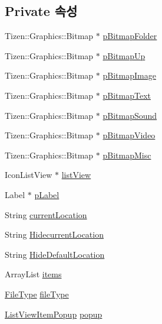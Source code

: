 \subsection*{Private 속성}
\begin{DoxyCompactItemize}
\item 
Tizen\+::\+Graphics\+::\+Bitmap $\ast$ \hyperlink{class_folder_browser_a59c025c6956a8a9ef74395d12261a36e}{p\+Bitmap\+Folder}
\item 
Tizen\+::\+Graphics\+::\+Bitmap $\ast$ \hyperlink{class_folder_browser_a7299cea38b070d659f6b2e35e4dbdd08}{p\+Bitmap\+Up}
\item 
Tizen\+::\+Graphics\+::\+Bitmap $\ast$ \hyperlink{class_folder_browser_a4d40caed1664eca59bbf9e3da1cde15c}{p\+Bitmap\+Image}
\item 
Tizen\+::\+Graphics\+::\+Bitmap $\ast$ \hyperlink{class_folder_browser_ac204936172a6e66bcf444e2cd9ff7ec4}{p\+Bitmap\+Text}
\item 
Tizen\+::\+Graphics\+::\+Bitmap $\ast$ \hyperlink{class_folder_browser_a375413fdf422f14ee9ea6ab055ffaebd}{p\+Bitmap\+Sound}
\item 
Tizen\+::\+Graphics\+::\+Bitmap $\ast$ \hyperlink{class_folder_browser_a90c038f6f300762824cdca08b339c974}{p\+Bitmap\+Video}
\item 
Tizen\+::\+Graphics\+::\+Bitmap $\ast$ \hyperlink{class_folder_browser_aa92204857b0b7a8d056ab74f5d9bc962}{p\+Bitmap\+Misc}
\item 
Icon\+List\+View $\ast$ \hyperlink{class_folder_browser_aee2bb8ad9f494b0ada8ee359a2e34555}{list\+View}
\item 
Label $\ast$ \hyperlink{class_folder_browser_ac56283b5a6a8dc00438d7bf4625c82bd}{p\+Label}
\item 
String \hyperlink{class_folder_browser_a1f7bc249da2f28c6a03759a983eacf75}{current\+Location}
\item 
String \hyperlink{class_folder_browser_acfb2670184ff88e3b06e2562d02983ce}{Hidecurrent\+Location}
\item 
String \hyperlink{class_folder_browser_a7573f676c492fcd3a5d63319cd5eb325}{Hide\+Default\+Location}
\item 
Array\+List \hyperlink{class_folder_browser_ae88620740bd179b78a573f1db28c50ba}{items}
\item 
\hyperlink{_folder_browser_8h_a0fab6cfad193ba9c1d78c6bb69c9426f}{File\+Type} \hyperlink{class_folder_browser_ab240fcb3674e6887f601fd23c25477f3}{file\+Type}
\item 
\hyperlink{class_list_view_item_popup}{List\+View\+Item\+Popup} \hyperlink{class_folder_browser_a9715e8af0c63d75be7c1d65f3c4b47f8}{popup}
\end{DoxyCompactItemize}


